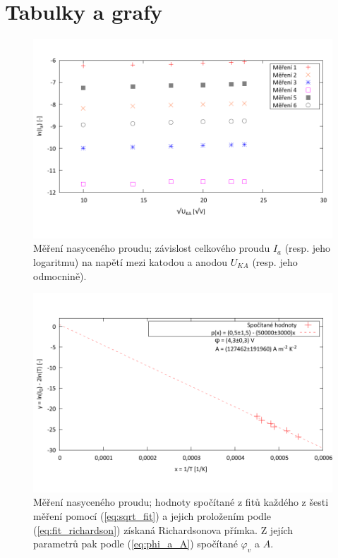 \documentclass[english]{article}
\begin{document}
\section{Tabulky a grafy}
	\begin{figure}[h!]
	\begin{center}
	    \vspace*{-1cm}
		\includegraphics[width=\linewidth]{../gnuplot/termise.pdf}
	    \vspace*{-2cm}
		\caption{Měření nasyceného proudu; závislost celkového proudu $I_a$ (resp. jeho logaritmu) na napětí mezi katodou a anodou $U_{KA}$ (resp. jeho odmocnině).} 
		\label{fig:g_termise}
	\end{center}
	\end{figure}		

	\begin{figure}[h!]
	\begin{center}
	    \vspace*{-1cm}
		\includegraphics[width=\linewidth]{../gnuplot/termiserich.pdf}
	    \vspace*{-2cm}
		\caption{Měření nasyceného proudu; hodnoty spočítané z fitů každého z šesti měření pomocí (\ref{eq:sqrt_fit}) a jejich proložením podle (\ref{eq:fit_richardson}) získaná Richardsonova přímka. Z jejích parametrů pak podle (\ref{eq:phi_a_A}) spočítané $\varphi_v$ a $A$. } 
		\label{fig:g_termiserich}
	\end{center}
	\end{figure}		
\end{document}
